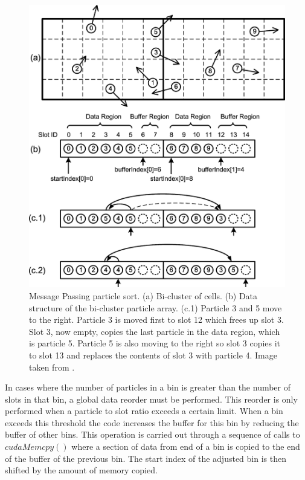 \begin{figure}
\begin{center}
\includegraphics[width=5in]{design/kong_sort.png}
\end{center}
\caption[Message Passing Particle Sort]{Message Passing particle sort. (a) Bi-cluster of cells. (b) Data structure of the bi-cluster particle array. (c.1) Particle 3 and 5 move to the right. Particle 3 is moved first to slot 12 which frees up slot 3. Slot 3, now empty, copies the last particle in the data region, which is particle 5. Particle 5 is also moving to the right so slot 3 copies it to slot 13 and replaces the contents of slot 3 with particle 4. Image taken from \cite{Kong2011}.}
\label{fig:kong_sort}
\end{figure}

	In cases where the number of particles in a bin is greater than the number of slots in that bin, a global data reorder must be performed. This reorder is only performed when a particle to slot ratio exceeds a certain limit. When a bin exceeds this threshold the code increases the buffer for this bin by reducing the buffer of other bins. This operation is carried out through a sequence of calls to $cudaMemcpy()$ where a section of data from end of a bin is copied to the end of the buffer of the previous bin. The start index of the adjusted bin is then shifted by the amount of memory copied. \cite{Kong2011}

